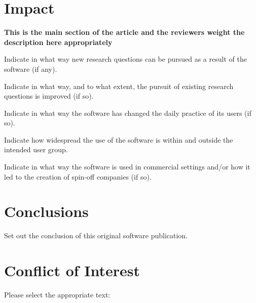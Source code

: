 \documentclass[preprint,12pt, a4paper]{elsarticle}
\newcommand{\ket}[1]{\ensuremath{|#1\rangle}}
\newcommand{\1}{{\rm 1\hspace{-0.9mm}l}}
\newcommand{\Id}{{\rm 1\hspace{-0.9mm}l}}
\newcommand{\ee}{\ensuremath{\mathrm{e}}}
\newcommand{\ii}{\ensuremath{\mathrm{i}}}
\newcommand{\PP}{\mathcal{P}}
\begin{document}






\section{Impact }


\textbf{This is the main section of the article and the reviewers weight the 
description here appropriately}

Indicate in what way new research questions can be pursued as a result of the 
software (if any).

Indicate in what way, and to what extent, the pursuit of existing research 
questions is improved (if so).

Indicate in what way the software has changed the daily practice of its users 
(if so).

Indicate how widespread the use of the software is within and outside the 
intended user group.

Indicate in what way the software is used in commercial settings and/or how it 
led to the creation of spin-off companies (if so).

\section{Conclusions}
\label{}

Set out the conclusion of this original software publication.

\section{Conflict of Interest}
Please select the appropriate text:
\end{document}

